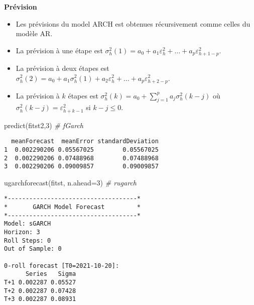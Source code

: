 \documentclass[
  ignorenonframetext,
]{beamer}
\newenvironment{Shaded}{\begin{snugshade}}{\end{snugshade}}
\newcommand{\AttributeTok}[1]{\textcolor[rgb]{0.77,0.63,0.00}{#1}}
\newcommand{\CommentTok}[1]{\textcolor[rgb]{0.56,0.35,0.01}{\textit{#1}}}
\newcommand{\DecValTok}[1]{\textcolor[rgb]{0.00,0.00,0.81}{#1}}
\newcommand{\FunctionTok}[1]{\textcolor[rgb]{0.00,0.00,0.00}{#1}}
\newcommand{\NormalTok}[1]{#1}
\begin{document}
\begin{frame}
\textbf{Prévision}

\begin{itemize}[<+->]
\item
  Les prévisions du model ARCH est obtenues récursivement comme celles
  du modèle AR.
\item
  La prévision à une étape est
  \(\sigma^2_h(1)=a_0+a_1 \varepsilon^2_h+\ldots+a_p \varepsilon^2_{h+1-p}\).
\item
  La prévision à deux étapes est
  \(\sigma^2_h(2)=a_0+a_1 \sigma^2_h(1)+a_2\varepsilon^2_h+\ldots+a_p \varepsilon^2_{h+2-p}\).
\item
  La prévision à \(k\) étapes est
  \(\sigma^2_h(k)=a_0+\displaystyle \sum_{j=1}^pa_j\sigma^2_h(k-j)\) où
  \(\sigma^2_h(k-j)=\varepsilon^2_{h+k-1}\) si \(k-j \leq 0\).
\end{itemize}
\end{frame}

\begin{frame}[fragile]
\begin{Shaded}
\begin{Highlighting}[]
\FunctionTok{predict}\NormalTok{(fitst2,}\DecValTok{3}\NormalTok{)           }\CommentTok{\# fGarch}
\end{Highlighting}
\end{Shaded}

\begin{verbatim}
  meanForecast  meanError standardDeviation
1  0.002290206 0.05567025        0.05567025
2  0.002290206 0.07488968        0.07488968
3  0.002290206 0.09009857        0.09009857
\end{verbatim}

\begin{Shaded}
\begin{Highlighting}[]
\FunctionTok{ugarchforecast}\NormalTok{(fitst, }\AttributeTok{n.ahead=}\DecValTok{3}\NormalTok{)    }\CommentTok{\# rugarch}
\end{Highlighting}
\end{Shaded}

\begin{verbatim}
*------------------------------------*
*       GARCH Model Forecast         *
*------------------------------------*
Model: sGARCH
Horizon: 3
Roll Steps: 0
Out of Sample: 0

0-roll forecast [T0=2021-10-20]:
      Series   Sigma
T+1 0.002287 0.05527
T+2 0.002287 0.07428
T+3 0.002287 0.08931
\end{verbatim}
\end{frame}
\end{document}
